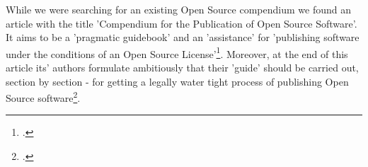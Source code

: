 %
%
%
%

%
While we were searching for an existing Open Source compendium we found an
article with the title 'Compendium for the Publication of Open Source
Software'. It aims to be a 'pragmatic
guidebook' and an 'assistance' for 'publishing software under the conditions of
an Open Source License'\footcite[cf.][166f (originally: ein
\glqq{}pragmatischer Ratgeber\grqq{} zur \glqq{}Veröffentlichung einer Software
unter den Rahmenbedingungen einer Open-Source-Lizenz\grqq{}) ]{BreGlaGra2008a}.
Moreover, at the end of this article its' authors formulate ambitiously that
their 'guide' should be carried out, section by section - for getting a legally
water tight process of publishing Open Source software\footcite[cf.][186
(originally: ein \glqq{}Ratgeber\grqq{}, der es erlaubt \glqq{} (\ldots) die zu
berücksichtigende Aspekte (strukturiert abzuarbeiten) (\ldots) \glqq{} und einen
\glqq{}rechtlich nicht angreifbaren Veröffentlichungsprozess\grqq{} zu
ermöglichen) ]{BreGlaGra2008a}.

